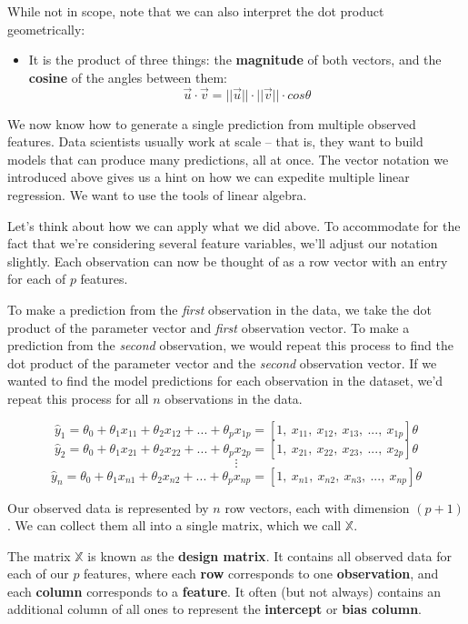 \documentclass[
  letterpaper,
  DIV=11,
  numbers=noendperiod]{scrreprt}
\providecommand{\tightlist}{%
  \setlength{\itemsep}{0pt}\setlength{\parskip}{0pt}}\usepackage{longtable,booktabs,array}
\begin{document}
\begin{tcolorbox}
While not in scope, note that we can also interpret the dot product
geometrically:

\begin{itemize}
\tightlist
\item
  It is the product of three things: the \textbf{magnitude} of both
  vectors, and the \textbf{cosine} of the angles between them:
  \[\vec{u} \cdot \vec{v} = ||\vec{u}|| \cdot ||\vec{v}|| \cdot {cos \theta}\]
\end{itemize}

\end{tcolorbox}

We now know how to generate a single prediction from multiple observed
features. Data scientists usually work at scale -- that is, they want to
build models that can produce many predictions, all at once. The vector
notation we introduced above gives us a hint on how we can expedite
multiple linear regression. We want to use the tools of linear algebra.

Let's think about how we can apply what we did above. To accommodate for
the fact that we're considering several feature variables, we'll adjust
our notation slightly. Each observation can now be thought of as a row
vector with an entry for each of \(p\) features.

To make a prediction from the \emph{first} observation in the data, we
take the dot product of the parameter vector and \emph{first}
observation vector. To make a prediction from the \emph{second}
observation, we would repeat this process to find the dot product of the
parameter vector and the \emph{second} observation vector. If we wanted
to find the model predictions for each observation in the dataset, we'd
repeat this process for all \(n\) observations in the data.

\[\hat{y}_1 = \theta_0 + \theta_1 x_{11} + \theta_2 x_{12} + ... + \theta_p x_{1p} = [1,\:x_{11},\:x_{12},\:x_{13},\:...,\:x_{1p}] \theta\]
\[\hat{y}_2 = \theta_0 + \theta_1 x_{21} + \theta_2 x_{22} + ... + \theta_p x_{2p} = [1,\:x_{21},\:x_{22},\:x_{23},\:...,\:x_{2p}] \theta\]
\[\vdots\]
\[\hat{y}_n = \theta_0 + \theta_1 x_{n1} + \theta_2 x_{n2} + ... + \theta_p x_{np} = [1,\:x_{n1},\:x_{n2},\:x_{n3},\:...,\:x_{np}] \theta\]

Our observed data is represented by \(n\) row vectors, each with
dimension \((p+1)\). We can collect them all into a single matrix, which
we call \(\mathbb{X}\).

The matrix \(\mathbb{X}\) is known as the \textbf{design matrix}. It
contains all observed data for each of our \(p\) features, where each
\textbf{row} corresponds to one \textbf{observation}, and each
\textbf{column} corresponds to a \textbf{feature}. It often (but not
always) contains an additional column of all ones to represent the
\textbf{intercept} or \textbf{bias column}.
\end{document}
